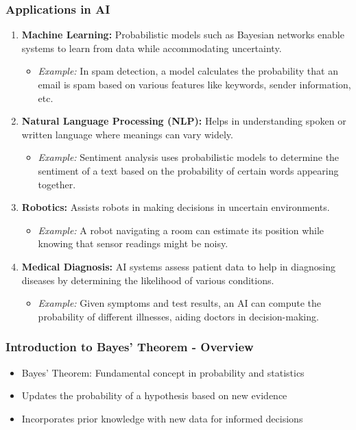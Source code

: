 \documentclass[aspectratio=169]{beamer}
\begin{document}
\begin{frame}[fragile]
    \frametitle{Applications in AI}
    \begin{enumerate}
        \item \textbf{Machine Learning:} Probabilistic models such as Bayesian networks enable systems to learn from data while accommodating uncertainty.
        \begin{itemize}
            \item \textit{Example:} In spam detection, a model calculates the probability that an email is spam based on various features like keywords, sender information, etc.
        \end{itemize}
        
        \item \textbf{Natural Language Processing (NLP):} Helps in understanding spoken or written language where meanings can vary widely.
        \begin{itemize}
            \item \textit{Example:} Sentiment analysis uses probabilistic models to determine the sentiment of a text based on the probability of certain words appearing together.
        \end{itemize}
        
        \item \textbf{Robotics:} Assists robots in making decisions in uncertain environments.
        \begin{itemize}
            \item \textit{Example:} A robot navigating a room can estimate its position while knowing that sensor readings might be noisy.
        \end{itemize}
        
        \item \textbf{Medical Diagnosis:} AI systems assess patient data to help in diagnosing diseases by determining the likelihood of various conditions.
        \begin{itemize}
            \item \textit{Example:} Given symptoms and test results, an AI can compute the probability of different illnesses, aiding doctors in decision-making.
        \end{itemize}
    \end{enumerate}
\end{frame}

\begin{frame}[fragile]
    \frametitle{Introduction to Bayes' Theorem - Overview}
    \begin{itemize}
        \item Bayes' Theorem: Fundamental concept in probability and statistics
        \item Updates the probability of a hypothesis based on new evidence
        \item Incorporates prior knowledge with new data for informed decisions
    \end{itemize}
\end{frame}
\end{document}
